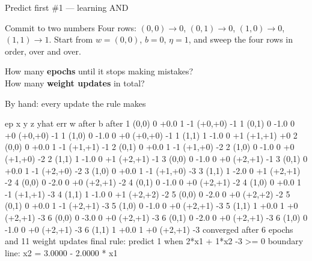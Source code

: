 \documentclass[aspectratio=169]{beamer}
\begin{document}
\begin{frame}{Predict first \#1 --- learning AND}
  \begin{alertblock}{Commit to two numbers}
    Four rows: $(0,0)\to 0$, $(0,1)\to 0$, $(1,0)\to 0$, $(1,1)\to 1$.
    Start from $w = (0,0)$, $b = 0$, $\eta = 1$, and sweep the four rows in
    order, over and over.

    \medskip
    \centering\large
    How many \textbf{epochs} until it stops making mistakes?\\
    How many \textbf{weight updates} in total?
  \end{alertblock}
\end{frame}

\begin{frame}[fragile,shrink=13]{By hand: every update the rule makes}
\begin{outblk}
 ep  x        y  z      yhat  err   w after      b after
  1  (0,0)  0   +0.0   1    -1   (+0,+0)     -1
  1  (0,1)  0   -1.0   0    +0   (+0,+0)     -1
  1  (1,0)  0   -1.0   0    +0   (+0,+0)     -1
  1  (1,1)  1   -1.0   0    +1   (+1,+1)     +0
  2  (0,0)  0   +0.0   1    -1   (+1,+1)     -1
  2  (0,1)  0   +0.0   1    -1   (+1,+0)     -2
  2  (1,0)  0   -1.0   0    +0   (+1,+0)     -2
  2  (1,1)  1   -1.0   0    +1   (+2,+1)     -1
  3  (0,0)  0   -1.0   0    +0   (+2,+1)     -1
  3  (0,1)  0   +0.0   1    -1   (+2,+0)     -2
  3  (1,0)  0   +0.0   1    -1   (+1,+0)     -3
  3  (1,1)  1   -2.0   0    +1   (+2,+1)     -2
  4  (0,0)  0   -2.0   0    +0   (+2,+1)     -2
  4  (0,1)  0   -1.0   0    +0   (+2,+1)     -2
  4  (1,0)  0   +0.0   1    -1   (+1,+1)     -3
  4  (1,1)  1   -1.0   0    +1   (+2,+2)     -2
  5  (0,0)  0   -2.0   0    +0   (+2,+2)     -2
  5  (0,1)  0   +0.0   1    -1   (+2,+1)     -3
  5  (1,0)  0   -1.0   0    +0   (+2,+1)     -3
  5  (1,1)  1   +0.0   1    +0   (+2,+1)     -3
  6  (0,0)  0   -3.0   0    +0   (+2,+1)     -3
  6  (0,1)  0   -2.0   0    +0   (+2,+1)     -3
  6  (1,0)  0   -1.0   0    +0   (+2,+1)     -3
  6  (1,1)  1   +0.0   1    +0   (+2,+1)     -3
converged after 6 epochs and 11 weight updates
final rule: predict 1 when 2*x1 + 1*x2 -3 >= 0
boundary line: x2 = 3.0000 - 2.0000 * x1
\end{outblk}
\end{frame}
\end{document}
